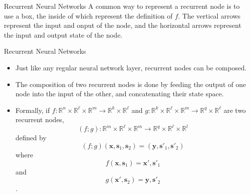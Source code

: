 \documentclass[10pt]{beamer}
\newcommand{\R}{\mathbb{R}}
\newcommand{\x}{\mathbf{x}}
\newcommand{\y}{\mathbf{y}}
\newcommand{\s}{\mathbf{s}}
\begin{document}
\begin{frame}{Recurrent Neural Networks}
   A common way to represent a recurrent node is to use a box, the inside of which represent the definition of $f$.  The vertical arrows represent the input and onput of the node, and the horizontal arrows represent the input and output state of the node.
  \begin{center}
  \end{center}
\end{frame}

\begin{frame}{Recurrent Neural Networks}
  \begin{itemize}
  \item Just like any regular neural network layer, recurrent nodes can be composed.
  \item The composition of two recurrent nodes is done by feeding the output of one node into the input of the other, and concatenating their state space.
  \item Formally, if $f:\R^n\times \R^\ell\times\R^m\to \R^k\times \R^\ell$ and $g:\R^k\times \R^\ell\times\R^m\to \R^q\times \R^\ell$ are two recurrent nodes, $$(f;g):\R^m\times\R^\ell\times\R^m\to\R^q\times\R^\ell\times\R^l$$ defined by $$(f;g)(\x, \s_1, \s_2) = (\y, \s'_1, \s'_2)$$ where $$f(\x, \s_1) = \x', \s'_1$$ and $$g(\x', \s_2) = \y, \s'_2$$.
\end{itemize}
\end{frame}
\end{document}
